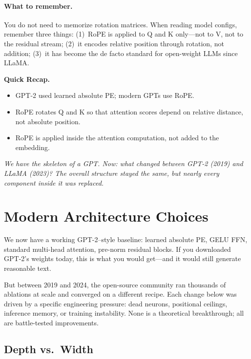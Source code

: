 \paragraph{What to remember.} You do not need to memorize rotation matrices. When reading model configs, remember three things: (1)~RoPE is applied to Q and K only---not to V, not to the residual stream; (2)~it encodes relative position through rotation, not addition; (3)~it has become the de facto standard for open-weight LLMs since LLaMA.

\begin{quickrecap}
\textbf{Quick Recap.}
\begin{itemize}[nosep,leftmargin=1.5em]
  \item GPT-2 used learned absolute PE; modern GPTs use RoPE.
  \item RoPE rotates Q and K so that attention scores depend on relative distance, not absolute position.
  \item RoPE is applied inside the attention computation, not added to the embedding.
\end{itemize}
\textit{We have the skeleton of a GPT. Now: what changed between GPT-2 (2019) and LLaMA (2023)? The overall structure stayed the same, but nearly every component inside it was replaced.}
\end{quickrecap}


\section{Modern Architecture Choices}
\label{sec:modern-choices}

We now have a working GPT-2--style baseline: learned absolute PE, GELU FFN, standard multi-head attention, pre-norm residual blocks. If you downloaded GPT-2's weights today, this is what you would get---and it would still generate reasonable text.

But between 2019 and 2024, the open-source community ran thousands of ablations at scale and converged on a different recipe. Each change below was driven by a specific engineering pressure: dead neurons, positional ceilings, inference memory, or training instability. None is a theoretical breakthrough; all are battle-tested improvements.

\subsection{Depth vs.\ Width}

